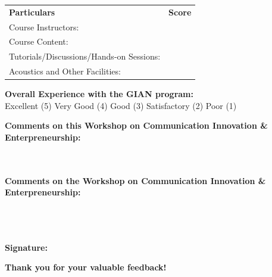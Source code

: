 \documentclass[10pt]{article}
\begin{document}
\vspace{0.3cm}
\begin{tabular}{p{} p{}}
\textbf{Particulars} & \textbf{Score} \\[0.5ex]
Course Instructors: & \underline{\hspace{3cm}} \\
Course Content: & \underline{\hspace{3cm}} \\
Tutorials/Discussions/Hands-on Sessions: & \underline{\hspace{3cm}} \\
Acoustics and Other Facilities: & \underline{\hspace{3cm}} \\
\end{tabular}

\vspace{0.3cm}
\textbf{Overall Experience with the GIAN program:}\\[0.1cm]
Excellent (5) \quad Very Good (4) \quad Good (3) \quad Satisfactory (2) \quad Poor (1)

\vspace{0.5cm}
\textbf{Comments on this Workshop on Communication Innovation \& Enterpreneurship:}\\[0.1cm]
\underline{\hspace{\textwidth}}\\[0.5cm]
\underline{\hspace{\textwidth}}\\[0.5cm]
\underline{\hspace{\textwidth}}

\vspace{0.5cm}
\textbf{Comments on the Workshop on Communication Innovation \& Enterpreneurship:}\\[0.1cm]
\underline{\hspace{\textwidth}}\\[0.5cm]
\underline{\hspace{\textwidth}}\\[0.5cm]
\underline{\hspace{\textwidth}}\\[0.5cm]
\underline{\hspace{\textwidth}}

\vspace{0.5cm}
\textbf{Signature:} \underline{\hspace{4cm}}

\vspace{0.5cm}
\begin{center}
    \textbf{Thank you for your valuable feedback!}
\end{center}
\end{document}
